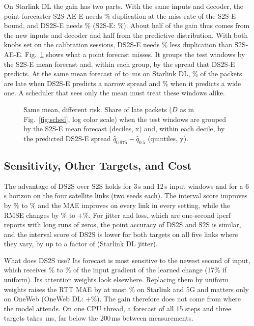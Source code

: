 On Starlink DL the gain has two parts. With the same inputs and decoder, the point forecaster S2S-AE-E needs \SchedFFdupSLDL\% duplication at the miss rate of the S2S-E bound, and DS2S-E needs \SchedDSdupCurveSLDL\% (S2S-E: \SchedSSdupCurveSLDL\%). About half of the gain thus comes from the new inputs and decoder and half from the predictive distribution. With both knobs set on the calibration sessions, DS2S-E needs \SchedSaveFFSLDL\% less duplication than S2S-AE-E. \GaussSchedSentence{} Fig.~\ref{fig:risk} shows what a point forecast misses. It groups the test windows by the S2S-E mean forecast and, within each group, by the spread that DS2S-E predicts. At the same mean forecast of \RiskMeanLo{} to \RiskMeanHi\,ms on Starlink DL, \RiskLowPct\% of the packets are late when DS2S-E predicts a narrow spread and \RiskHighPct\% when it predicts a wide one. A scheduler that sees only the mean must treat these windows alike.

\begin{figure}[t]
  \centering
  
  \caption{Same mean, different risk. Share of late packets ($D$ as in Fig.~\ref{fig:sched}, log color scale) when the test windows are grouped by the S2S-E mean forecast (deciles, x) and, within each decile, by the predicted DS2S-E spread $\hat{q}_{0.975}-\hat{q}_{0.5}$ (quintiles, y).}
  \label{fig:risk}
\end{figure}

\subsection{Sensitivity, Other Targets, and Cost}
\label{sec:sens}
The advantage of DS2S over S2S holds for 3\,s and 12\,s input windows and for a 6\,s horizon on the four satellite links (two seeds each). The interval score improves by \SweepISLoAbs\% to \SweepISHiAbs\% and the MAE improves on every link in every setting, while the RMSE changes by \SweepRMSELo\% to $+$\SweepRMSEHi\%. \WeightSentence{} For jitter and loss, which are one-second iperf reports with long runs of zeros, the point accuracy of DS2S and S2S is similar, and the interval score of DS2S is lower for both targets on all five links where they vary, by up to a factor of \JitISRatio{} (Starlink DL jitter).

What does DS2S use? Its forecast is most sensitive to the newest second of input, which receives \GradLastLo\% to \GradLastHi\% of the input gradient of the learned change (17\% if uniform). Its attention weights look elsewhere. Replacing them by uniform weights raises the RTT MAE by at most \AttnAblMax\% on Starlink and 5G and matters only on OneWeb (OneWeb DL: $+$\AttnAblOWDL\%). The gain therefore does not come from where the model attends. On one CPU thread, a forecast of all 15 steps and three targets takes \TimeDSCPU\,ms, far below the 200\,ms between measurements.
